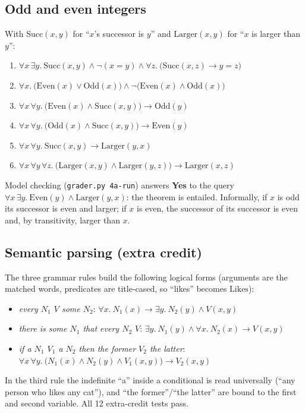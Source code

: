 \subsection{Odd and even integers}
With $\text{Succ}(x,y)$ for ``$x$'s successor is $y$'' and $\text{Larger}(x,y)$ for ``$x$ is larger than $y$'':
\begin{enumerate}[label=(\arabic*),start=0,nosep]
  \item $\forall x\,\exists y.\ \text{Succ}(x,y)\wedge\neg(x=y)\wedge\forall z.\ \bigl(\text{Succ}(x,z)\to y=z\bigr)$
  \item $\forall x.\ \bigl(\text{Even}(x)\vee\text{Odd}(x)\bigr)\wedge\neg\bigl(\text{Even}(x)\wedge\text{Odd}(x)\bigr)$
  \item $\forall x\,\forall y.\ \bigl(\text{Even}(x)\wedge\text{Succ}(x,y)\bigr)\to\text{Odd}(y)$
  \item $\forall x\,\forall y.\ \bigl(\text{Odd}(x)\wedge\text{Succ}(x,y)\bigr)\to\text{Even}(y)$
  \item $\forall x\,\forall y.\ \text{Succ}(x,y)\to\text{Larger}(y,x)$
  \item $\forall x\,\forall y\,\forall z.\ \bigl(\text{Larger}(x,y)\wedge\text{Larger}(y,z)\bigr)\to\text{Larger}(x,z)$
\end{enumerate}
Model checking (\texttt{grader.py 4a-run}) answers \textbf{Yes} to the query
$\forall x\,\exists y.\ \text{Even}(y)\wedge\text{Larger}(y,x)$: the theorem is entailed. Informally, if $x$ is odd
its successor is even and larger; if $x$ is even, the successor of its successor is even and, by transitivity,
larger than $x$.

\subsection{Semantic parsing (extra credit)}
The three grammar rules build the following logical forms (arguments are the matched words, predicates are
title-cased, so ``likes'' becomes $\text{Likes}$):
\begin{itemize}[nosep]
  \item \emph{every $N_1$ $V$ some $N_2$}: \quad $\forall x.\ N_1(x)\to\exists y.\ N_2(y)\wedge V(x,y)$
  \item \emph{there is some $N_1$ that every $N_2$ $V$}: \quad $\exists y.\ N_1(y)\wedge\forall x.\ N_2(x)\to V(x,y)$
  \item \emph{if a $N_1$ $V_1$ a $N_2$ then the former $V_2$ the latter}: \quad
        $\forall x\,\forall y.\ \bigl(N_1(x)\wedge N_2(y)\wedge V_1(x,y)\bigr)\to V_2(x,y)$
\end{itemize}
In the third rule the indefinite ``a'' inside a conditional is read universally (``any person who likes any
cat''), and ``the former''/``the latter'' are bound to the first and second variable. All 12 extra-credit tests
pass.

